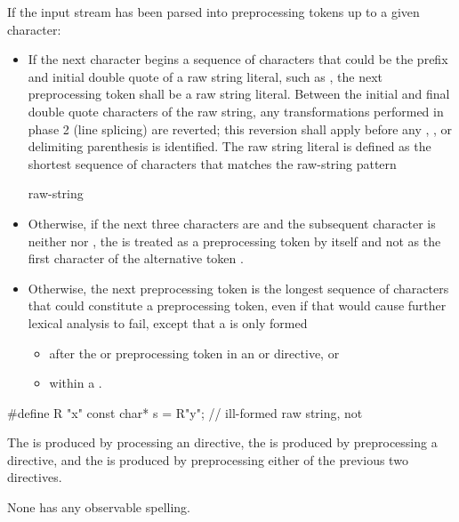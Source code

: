 \pnum
If the input stream has been parsed into preprocessing tokens up to a
given character:
\begin{itemize}
\item
{}%
If the next character begins a sequence of characters that could be the prefix
and initial double quote of a raw string literal, such as , the next preprocessing
token shall be a raw string literal. Between the initial and final
double quote characters of the raw string, any transformations performed in phase
2 (line splicing) are reverted; this reversion
shall apply before any , , or delimiting
parenthesis is identified. The raw string literal is defined as the shortest sequence
of characters that matches the raw-string pattern
\begin{ncbnf}
  raw-string
\end{ncbnf}

\item Otherwise, if the next three characters are \tcode{<::} and the subsequent character
is neither \tcode{:} nor \tcode{>}, the \tcode{<} is treated as a preprocessing token by
itself and not as the first character of the alternative token \tcode{<:}.

\item Otherwise,
the next preprocessing token is the longest sequence of
characters that could constitute a preprocessing token, even if that
would cause further lexical analysis to fail,
except that a  is only formed
\begin{itemize}
\item
after the  or  preprocessing token in an
 or
 directive, or

\item
within a .

\end{itemize}
\end{itemize}

\begin{example}
\begin{codeblock}
#define R "x"
const char* s = R"y";           // ill-formed raw string, not 
\end{codeblock}
\end{example}

\pnum
The  is produced
by processing an  directive,
the  is produced
by preprocessing a  directive, and
the  is produced
by preprocessing either of the previous two directives.
\begin{note}
None has any observable spelling.
\end{note}


